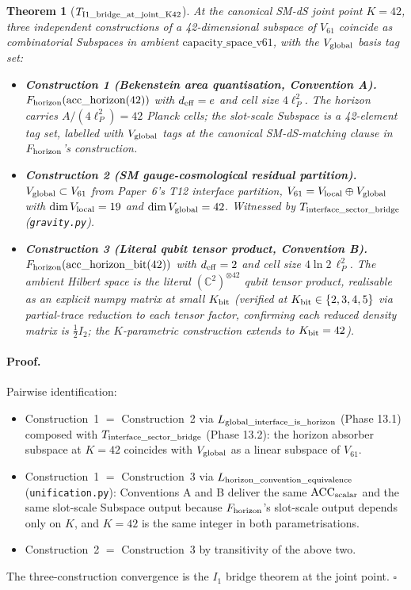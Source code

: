 \documentclass[11pt]{article}
\theoremstyle{plain}
\newtheorem{theorem}{Theorem}[section]
\theoremstyle{definition}
\theoremstyle{remark}
\begin{document}
\begin{theorem}[$T_{\rm I1\_bridge\_at\_joint\_K42}$]\label{thm:I1_bridge_K42}
At the canonical SM-dS joint point $K = 42$, three independent constructions of a 42-dimensional subspace of $V_{61}$ coincide as combinatorial Subspaces in ambient $\text{capacity\_space\_v61}$, with the $V_{\rm global}$ basis tag set:
\begin{itemize}[leftmargin=2em,itemsep=2pt]
  \item \textbf{Construction 1 (Bekenstein area quantisation, Convention A).}  $F_{\rm horizon}(\text{acc\_horizon}(42))$ with $d_{\rm eff} = e$ and cell size $4\ell_P^2$.  The horizon carries $A/(4\ell_P^2) = 42$ Planck cells; the slot-scale Subspace is a 42-element tag set, labelled with $V_{\rm global}$ tags at the canonical SM-dS-matching clause in $F_{\rm horizon}$'s construction.
  \item \textbf{Construction 2 (SM gauge-cosmological residual partition).}  $V_{\rm global} \subset V_{61}$ from Paper~6's T12 interface partition, $V_{61} = V_{\rm local} \oplus V_{\rm global}$ with $\dim V_{\rm local} = 19$ and $\dim V_{\rm global} = 42$.  Witnessed by $T_{\rm interface\_sector\_bridge}$ (\texttt{gravity.py}).
  \item \textbf{Construction 3 (Literal qubit tensor product, Convention B).}  $F_{\rm horizon}(\text{acc\_horizon\_bit}(42))$ with $d_{\rm eff} = 2$ and cell size $4\ln 2 \, \ell_P^2$.  The ambient Hilbert space is the \emph{literal} $(\mathbb{C}^2)^{\otimes 42}$ qubit tensor product, realisable as an explicit numpy matrix at small $K_{\rm bit}$ (verified at $K_{\rm bit} \in \{2, 3, 4, 5\}$ via partial-trace reduction to each tensor factor, confirming each reduced density matrix is $\frac{1}{2} I_2$; the $K$-parametric construction extends to $K_{\rm bit} = 42$).
\end{itemize}
\end{theorem}

\paragraph{Proof.}  Pairwise identification:
\begin{itemize}[leftmargin=2em,itemsep=2pt]
  \item Construction~1 $=$ Construction~2 via $L_{\rm global\_interface\_is\_horizon}$ (Phase 13.1) composed with $T_{\rm interface\_sector\_bridge}$ (Phase 13.2): the horizon absorber subspace at $K = 42$ coincides with $V_{\rm global}$ as a linear subspace of $V_{61}$.
  \item Construction~1 $=$ Construction~3 via $L_{\rm horizon\_convention\_equivalence}$ (\texttt{unification.py}): Conventions A and B deliver the same $\mathrm{ACC}_{\rm scalar}$ and the same slot-scale Subspace output because $F_{\rm horizon}$'s slot-scale output depends only on $K$, and $K = 42$ is the same integer in both parametrisations.
  \item Construction~2 $=$ Construction~3 by transitivity of the above two.
\end{itemize}
The three-construction convergence is the $I_1$ bridge theorem at the joint point.  $\square$
\end{document}
